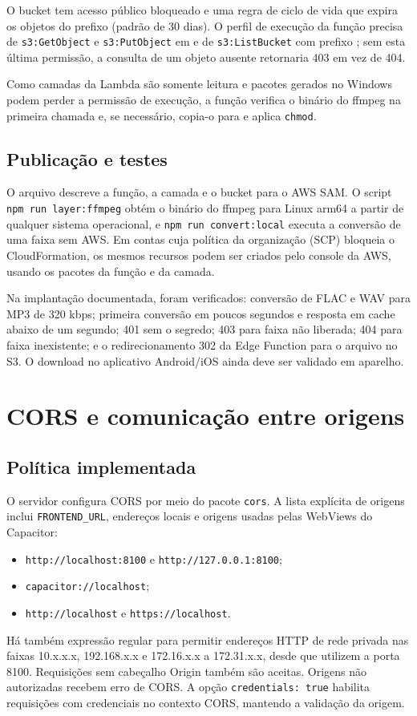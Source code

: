 \documentclass[12pt,a4paper,oneside]{report}
\newcommand{\arquivo}[1]{\texttt{\detokenize{#1}}}
\begin{document}
O bucket tem acesso público bloqueado e uma regra de ciclo de vida que expira os objetos do prefixo \arquivo{mp3/} (padrão de 30 dias). O perfil de execução da função precisa de \texttt{s3:GetObject} e \texttt{s3:PutObject} em \arquivo{mp3/*} e de \texttt{s3:ListBucket} com prefixo \arquivo{mp3/}; sem esta última permissão, a consulta de um objeto ausente retornaria 403 em vez de 404.

Como camadas da Lambda são somente leitura e pacotes gerados no Windows podem perder a permissão de execução, a função verifica o binário do ffmpeg na primeira chamada e, se necessário, copia-o para \arquivo{/tmp} e aplica \texttt{chmod}.

\section{Publicação e testes}
O arquivo \arquivo{aws/mp3-converter/template.yaml} descreve a função, a camada e o bucket para o AWS SAM. O script \texttt{npm run layer:ffmpeg} obtém o binário do ffmpeg para Linux arm64 a partir de qualquer sistema operacional, e \texttt{npm run convert:local} executa a conversão de uma faixa sem AWS. Em contas cuja política da organização (SCP) bloqueia o CloudFormation, os mesmos recursos podem ser criados pelo console da AWS, usando os pacotes da função e da camada.

Na implantação documentada, foram verificados: conversão de FLAC e WAV para MP3 de 320 kbps; primeira conversão em poucos segundos e resposta em cache abaixo de um segundo; 401 sem o segredo; 403 para faixa não liberada; 404 para faixa inexistente; e o redirecionamento 302 da Edge Function para o arquivo no S3. O download no aplicativo Android/iOS ainda deve ser validado em aparelho.

\chapter{CORS e comunicação entre origens}
\section{Política implementada}
O servidor configura CORS por meio do pacote \texttt{cors}. A lista explícita de origens inclui \texttt{FRONTEND\_URL}, endereços locais e origens usadas pelas WebViews do Capacitor:
\begin{itemize}
\item \texttt{http://localhost:8100} e \texttt{http://127.0.0.1:8100};
\item \texttt{capacitor://localhost};
\item \texttt{http://localhost} e \texttt{https://localhost}.
\end{itemize}
Há também expressão regular para permitir endereços HTTP de rede privada nas faixas 10.x.x.x, 192.168.x.x e 172.16.x.x a 172.31.x.x, desde que utilizem a porta 8100. Requisições sem cabeçalho Origin também são aceitas. Origens não autorizadas recebem erro de CORS. A opção \texttt{credentials: true} habilita requisições com credenciais no contexto CORS, mantendo a validação da origem.
\end{document}
